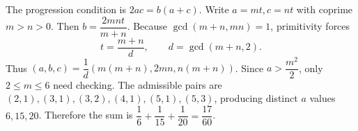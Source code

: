 The progression condition is $2ac=b(a+c)$. Write $a=mt,c=nt$ with coprime $m>n>0$. Then $b=\dfrac{2mnt}{m+n}$. Because $\gcd(m+n,mn)=1$, primitivity forces
\[
t=\dfrac{m+n}{d},\qquad d=\gcd(m+n,2).
\]
Thus $(a,b,c)=\dfrac{1}{d}(m(m+n),2mn,n(m+n))$. Since $a>\dfrac{m^2}{2}$, only $2\le m\le6$ need checking. The admissible pairs are $(2,1),(3,1),(3,2),(4,1),(5,1),(5,3)$, producing distinct $a$ values $6,15,20$. Therefore the sum is $\boxed{\dfrac{1}{6}+\dfrac{1}{15}+\dfrac{1}{20}=\dfrac{17}{60}}$.
